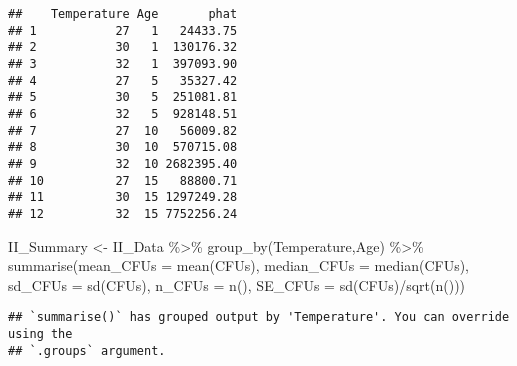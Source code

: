 \documentclass[
]{article}
\newenvironment{Shaded}{\begin{snugshade}}{\end{snugshade}}
\newcommand{\AttributeTok}[1]{\textcolor[rgb]{0.77,0.63,0.00}{#1}}
\newcommand{\FunctionTok}[1]{\textcolor[rgb]{0.00,0.00,0.00}{#1}}
\newcommand{\NormalTok}[1]{#1}
\newcommand{\OtherTok}[1]{\textcolor[rgb]{0.56,0.35,0.01}{#1}}
\newcommand{\SpecialCharTok}[1]{\textcolor[rgb]{0.00,0.00,0.00}{#1}}
\begin{document}
\begin{verbatim}
##    Temperature Age       phat
## 1           27   1   24433.75
## 2           30   1  130176.32
## 3           32   1  397093.90
## 4           27   5   35327.42
## 5           30   5  251081.81
## 6           32   5  928148.51
## 7           27  10   56009.82
## 8           30  10  570715.08
## 9           32  10 2682395.40
## 10          27  15   88800.71
## 11          30  15 1297249.28
## 12          32  15 7752256.24
\end{verbatim}

\begin{Shaded}
\begin{Highlighting}[]
\NormalTok{II\_Summary }\OtherTok{\textless{}{-}}\NormalTok{ II\_Data }\SpecialCharTok{\%\textgreater{}\%}
  \FunctionTok{group\_by}\NormalTok{(Temperature,Age) }\SpecialCharTok{\%\textgreater{}\%}
  \FunctionTok{summarise}\NormalTok{(}\AttributeTok{mean\_CFUs =} \FunctionTok{mean}\NormalTok{(CFUs),}
            \AttributeTok{median\_CFUs =} \FunctionTok{median}\NormalTok{(CFUs),}
            \AttributeTok{sd\_CFUs =} \FunctionTok{sd}\NormalTok{(CFUs),}
            \AttributeTok{n\_CFUs =} \FunctionTok{n}\NormalTok{(),}
            \AttributeTok{SE\_CFUs =} \FunctionTok{sd}\NormalTok{(CFUs)}\SpecialCharTok{/}\FunctionTok{sqrt}\NormalTok{(}\FunctionTok{n}\NormalTok{()))}
\end{Highlighting}
\end{Shaded}

\begin{verbatim}
## `summarise()` has grouped output by 'Temperature'. You can override using the
## `.groups` argument.
\end{verbatim}
\end{document}
